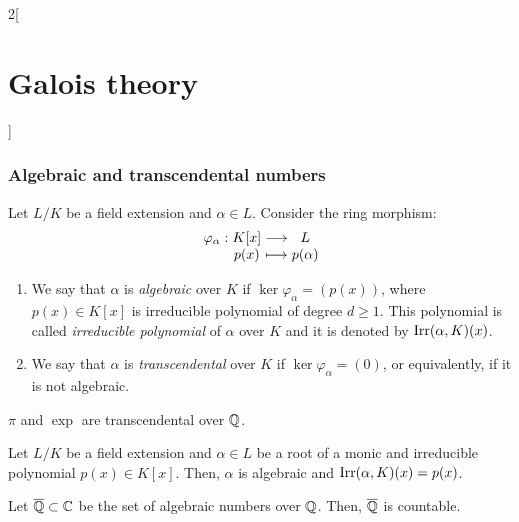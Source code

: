 \documentclass[../../../main.tex]{subfiles}
\begin{document}
\begin{multicols}{2}[\section{Galois theory}]
  \subsubsection{Algebraic and transcendental numbers}
  \begin{definition}
    Let $L/K$ be a field extension and $\alpha\in L$. Consider the ring morphism: $$\function{\varphi_\alpha}{K[x]}{L}{p(x)}{p(\alpha)}$$
    \begin{enumerate}
      \item We say that $\alpha$ is \emph{algebraic} over $K$ if $\ker\varphi_\alpha=(p(x))$, where $p(x)\in K[x]$ is irreducible polynomial of degree $d\geq 1$. This polynomial is called \emph{irreducible polynomial} of $\alpha$ over $K$ and it is denoted by $\operatorname{Irr}(\alpha,K)(x)$.
      \item We say that $\alpha$ is \emph{transcendental} over $K$ if $\ker\varphi_\alpha=(0)$, or equivalently, if it is not algebraic.
    \end{enumerate}
  \end{definition}
  \begin{prop}
    $\pi$ and $\exp{}$ are transcendental over $\mathbb{Q}$.
  \end{prop}
  \begin{prop}
    Let $L/K$ be a field extension and $\alpha\in L$ be a root of a monic and irreducible polynomial $p(x)\in K[x]$. Then, $\alpha$ is algebraic and $\operatorname{Irr}(\alpha,K)(x)=p(x)$.
  \end{prop}
  \begin{theorem}
    Let $\overline{\mathbb{Q}}\subset\mathbb{C}$ be the set of algebraic numbers over $\mathbb{Q}$. Then, $\overline{\mathbb{Q}}$ is countable.
  \end{theorem}

\end{multicols}
\end{document}
